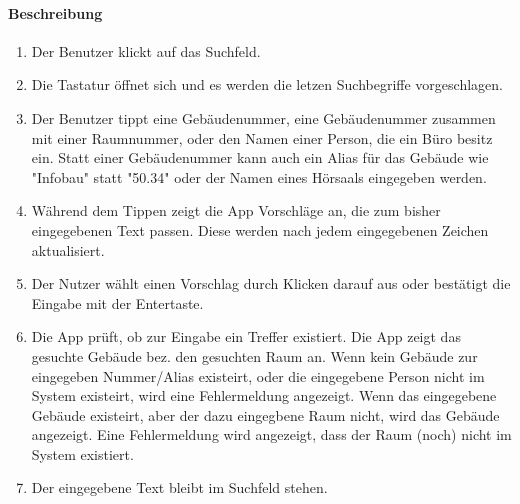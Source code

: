 \paragraph{Beschreibung}
\begin{enumerate}
    \item Der Benutzer klickt auf das Suchfeld.
    \item Die Tastatur öffnet sich und es werden die letzen Suchbegriffe vorgeschlagen.
    \item Der Benutzer tippt eine Gebäudenummer, eine Gebäudenummer zusammen mit einer Raumnummer, oder den Namen einer Person, die ein Büro besitz ein. Statt einer Gebäudenummer kann auch ein Alias für das Gebäude wie "Infobau" statt "50.34" oder der Namen eines Hörsaals eingegeben werden.
    \item Während dem Tippen zeigt die App Vorschläge an, die zum bisher eingegebenen Text passen. Diese werden nach jedem eingegebenen Zeichen aktualisiert.
    \item Der Nutzer wählt einen Vorschlag durch Klicken darauf aus oder bestätigt die Eingabe mit der Entertaste.
    \item Die App prüft, ob zur Eingabe ein Treffer existiert.
     Die App zeigt das gesuchte Gebäude bez. den gesuchten Raum an.
    \subsubitem Wenn kein Gebäude zur eingegeben Nummer/Alias existeirt, oder die eingegebene Person nicht im System existeirt, wird eine Fehlermeldung angezeigt.
    \subsubitem Wenn das eingegebene Gebäude existeirt, aber der dazu eingegbene Raum nicht, wird das Gebäude angezeigt. Eine Fehlermeldung wird angezeigt, dass der Raum (noch) nicht im System existiert.
    \item Der eingegebene Text bleibt im Suchfeld stehen.
\end{enumerate}